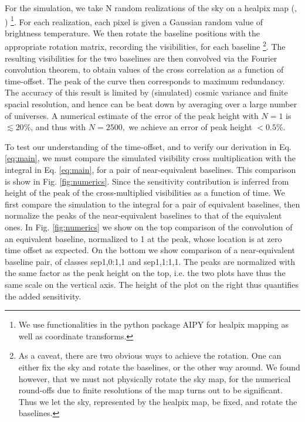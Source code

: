 \documentclass[preprint2,numberedappendix,tighten,twocolappendix]{aastex6}  %
\renewcommand\[{\begin{equation}}
\renewcommand\]{\end{equation}}
\begin{document}
For the simulation, we take N random realizations of the sky
on a healpix map (\cite{Heal}, \cite{HealPrimer}) \footnote{We use functionalities in the python package AIPY for healpix mapping
as well as coordinate transforms. }. For each realization, each pixel is given a Gaussian random value
of brightness temperature. We then rotate the baseline positions with
the appropriate rotation matrix, recording the visibilities, for each
baseline \footnote{As a caveat, there are two obvious ways to achieve the rotation. One
can either fix the sky and rotate the baselines, or the other way
around. We found however, that we must not physically rotate the sky
map, for the numerical round-offs due to finite resolutions of the
map turns out to be significant. Thus we let the sky, represented
by the healpix map, be fixed, and rotate the baselines. }. The resulting visibilities for the two baselines are then convolved
via the Fourier convolution theorem, to obtain values of the cross
correlation as a function of time-offset. The peak of the curve then
corresponds to maximum redundancy. The accuracy of this result is
limited by (simulated) cosmic variance and finite spacial resolution,
and hence can be beat down by averaging over a large number of universes.
A numerical estimate of the error of the peak height with $N=1$ is
$\lesssim20\%$, and thus with $N=2500,$ we achieve an error of peak
height $<0.5\%$. 

To test our understanding of the time-offset, and to verify our derivation
in Eq. \eqref{eq:main}, we must compare the simulated visibility cross multiplication with the integral in
Eq. \eqref{eq:main}, for a pair of near-equivalent baselines. 
This comparison is show in Fig. \ref{fig:numerics}. 
Since the sensitivity contribution is inferred from height of the peak of the cross-multiplied visibilities as a function of time. 
We first compare the simulation to the integral for a pair of equivalent baselines, then normalize the peaks 
of the near-equivalent baselines to that of the equivalent ones. 
In Fig. \ref{fig:numerics}  we show on the top comparison of
the convolution of an equivalent baseline, normalized to 1 at the
peak, whose location is at zero time offset as expected. On the bottom we show
comparison of a near-equivalent baseline pair, of classes sep1,0:1,1 and sep1,1:1,1. The peaks
are normalized with the same factor as the peak height on the top,
i.e. the two plots have thus the same scale on the vertical axis.
The height of the plot on the right thus quantifies the added sensitivity. 
\end{document}
